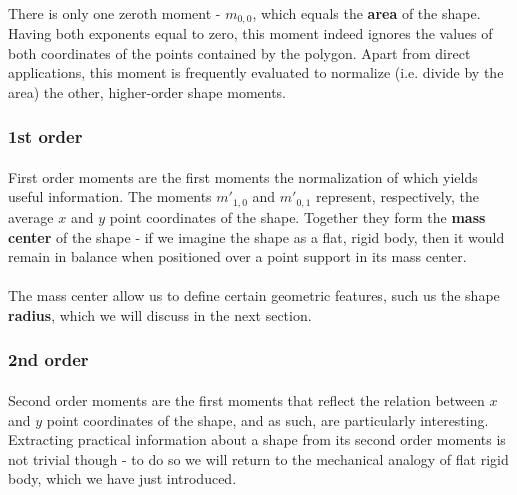 \paragraph*{}
There is only one zeroth moment - $m_{0,0}$, which equals the \textbf{area} of the shape. Having both exponents equal to zero, this moment indeed ignores the values of both coordinates of the points contained by the polygon. Apart from direct applications, this moment is frequently evaluated to normalize (i.e. divide by the area) the other, higher-order shape moments.

\subsubsection{1st order}

\paragraph*{}
First order moments are the first moments the normalization of which yields useful information. The moments $m'_{1,0}$ and $m'_{0,1}$ represent, respectively, the average $x$ and $y$ point coordinates of the shape. Together they form the \textbf{mass center} of the shape -  if we imagine the shape as a flat, rigid body, then it would remain in balance when positioned over a point support in its mass center.

\paragraph*{}
The mass center allow us to define certain geometric features, such us the shape \textbf{radius}, which we will discuss in the next section.

\subsubsection{2nd order} 

\paragraph*{}
Second order moments are the first moments that reflect the relation between $x$ and $y$ point coordinates of the shape, and as such, are particularly interesting. Extracting practical information about a shape from its second order moments is not trivial though - to do so we will return to the mechanical analogy of flat rigid body, which we have just introduced.


